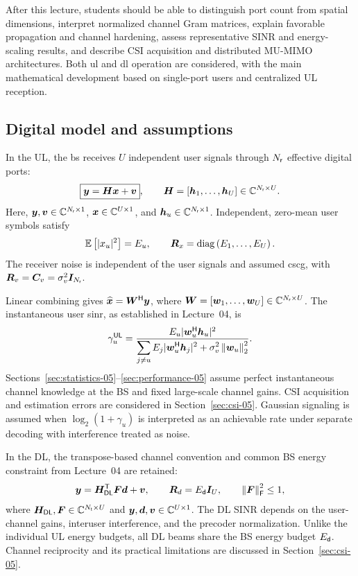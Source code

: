 After this lecture, students should be able to distinguish port count from spatial dimensions, interpret normalized channel Gram matrices, explain favorable propagation and channel hardening, assess representative SINR and energy-scaling results, and describe CSI acquisition and distributed MU-MIMO architectures. Both \ac{ul} and \ac{dl} operation are considered, with the main mathematical development based on single-port users and centralized UL reception.

\subsection{Digital model and assumptions}
In the UL, the \ac{bs} receives $U$ independent user signals through $N_{\mathsf{r}}$ effective digital ports:
\begin{equation}
	\boxed{\bm{y}=\bm{H}\bm{x}+\bm{v}},
	\qquad
	\bm{H}=[\bm{h}_1,\ldots,\bm{h}_U]\in\mathbb{C}^{N_{\mathsf{r}}\times U}.
	\label{eq:ulmodel-05}
\end{equation}
Here, $\bm{y},\bm{v}\in\mathbb{C}^{N_{\mathsf{r}}\times1}$, $\bm{x}\in\mathbb{C}^{U\times1}$, and $\bm{h}_u\in\mathbb{C}^{N_{\mathsf{r}}\times1}$. Independent, zero-mean user symbols satisfy
\begin{equation*}
	\mathbb{E}\left[|x_u|^2\right]=E_u,
	\qquad
	\bm{R}_x=\operatorname{diag}\left(E_1,\ldots,E_U\right).
\end{equation*}
The receiver noise is independent of the user signals and assumed \ac{cscg}, with $\bm{R}_v=\bm{C}_v=\sigma_v^2\bm{I}_{N_{\mathsf{r}}}$.

Linear combining gives $\widehat{\bm{x}}={\bm{W}}^{\mathsf{H}}\bm{y}$, where $\bm{W}=[\bm{w}_1,\ldots,\bm{w}_U]\in\mathbb{C}^{N_{\mathsf{r}}\times U}$. The instantaneous user \ac{sinr}, as established in Lecture~04, is
\begin{equation}
	\gamma_u^{\mathsf{UL}}=
	\frac{E_u|{\bm{w}}^{\mathsf{H}}_u\bm{h}_u|^2}
	{\displaystyle\sum_{j\ne u}E_j|{\bm{w}}^{\mathsf{H}}_u\bm{h}_j|^2+
		\sigma_v^2\left\|\bm{w}_u\right\|_2^2}.
	\label{eq:ulsinr-05}
\end{equation}
Sections~\ref{sec:statistics-05}--\ref{sec:performance-05} assume perfect instantaneous channel knowledge at the BS and fixed large-scale channel gains. CSI acquisition and estimation errors are considered in Section~\ref{sec:csi-05}. Gaussian signaling is assumed when $\log_2(1+\gamma_u)$ is interpreted as an achievable rate under separate decoding with interference treated as noise.

In the DL, the transpose-based channel convention and common BS energy constraint from Lecture~04 are retained:
\begin{equation*}
	\bm{y}={\bm{H}}^{\mathsf{T}}_{\mathsf{DL}}\bm{F}\bm{d}+\bm{v},
	\qquad
	\bm{R}_d=E_{\mathsf{d}}\bm{I}_U,
	\qquad
	\left\|\bm{F}\right\|_{\mathsf{F}}^2\leq1,
\end{equation*}
where $\bm{H}_{\mathsf{DL}},\bm{F}\in\mathbb{C}^{N_{\mathsf{t}}\times U}$ and $\bm{y},\bm{d},\bm{v}\in\mathbb{C}^{U\times1}$. The DL SINR depends on the user-channel gains, interuser interference, and the precoder normalization. Unlike the individual UL energy budgets, all DL beams share the BS energy budget $E_{\mathsf{d}}$. Channel reciprocity and its practical limitations are discussed in Section~\ref{sec:csi-05}.

